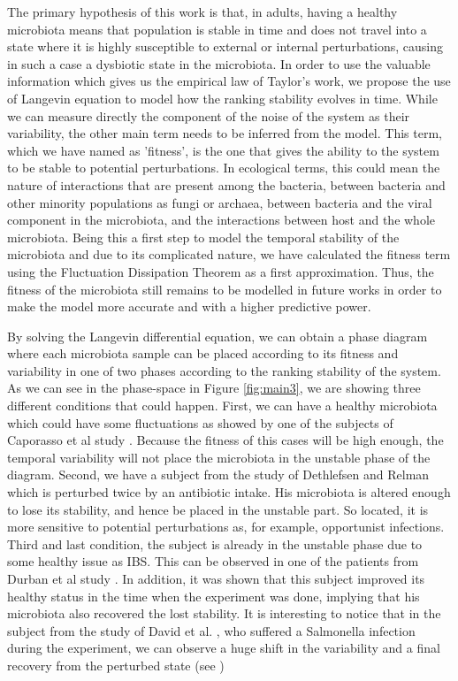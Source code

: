 The primary hypothesis of this work is that, in adults, having a healthy microbiota means that population is stable in time and does not travel into a state where it is highly susceptible to external or internal perturbations, causing in such a case a dysbiotic state in the microbiota. In order to use the valuable information which gives us the empirical law of Taylor's work, we propose the use of Langevin equation to model how the ranking stability evolves in time. While we can measure directly the component of the noise of the system as their variability, the other main term needs to be inferred from the model. This term, which we have named as 'fitness', is the one that gives the ability to the system to be stable to potential perturbations. In ecological terms, this could mean the nature of interactions that are present among the bacteria, between bacteria and other minority populations as fungi or archaea, between bacteria and the viral component in the microbiota, and the interactions between host and the whole microbiota. Being this a first step to model the temporal stability of the microbiota and due to its complicated nature, we have calculated the fitness term using the Fluctuation Dissipation Theorem as a first approximation\cite{FD}. Thus, the fitness of the microbiota still remains to be modelled in future works in order to make the model more accurate and with a higher predictive power. 

By solving the Langevin differential equation, we can obtain a phase diagram where each microbiota sample can be placed according to its fitness and variability in one of two phases according to the ranking stability of the system. As we can see in the phase-space in Figure \ref{fig:main3}, we are showing three different conditions that could happen. First, we can have a healthy microbiota which could have some fluctuations as showed by one of the subjects of Caporasso et al study \cite{moving}. Because the fitness of this cases will be high enough, the temporal variability will not place the microbiota in the unstable phase of the diagram. Second, we have a subject from the study of Dethlefsen and Relman \cite{antibiotic} which is perturbed twice by an antibiotic intake. His microbiota is altered enough to lose its stability, and hence be placed in the unstable part. So located, it is more sensitive to potential perturbations as, for example, opportunist infections. Third and last condition, the subject is already in the unstable phase due to some healthy issue as IBS. This can be observed in one of the patients from Durban et al study \cite{IBS}. In addition, it was shown that this subject improved its healthy status in the time when the experiment was done, implying that his microbiota also recovered the lost stability. It is interesting to notice that in the subject from the study of David et al. \cite{lifehost}, who suffered a Salmonella infection during the experiment, we can observe a huge shift in the variability and a final recovery from the perturbed state (see )
 

